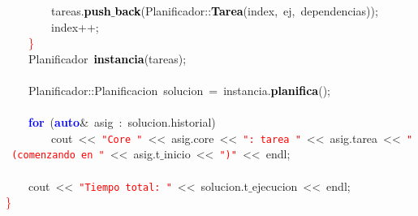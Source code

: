 \mbox{}\ \ \ \ \ \ \ \ tareas\textcolor{BrickRed}{.}\textbf{\textcolor{Black}{push$\_$back}}\textcolor{BrickRed}{(}Planificador\textcolor{BrickRed}{::}\textbf{\textcolor{Black}{Tarea}}\textcolor{BrickRed}{(}index\textcolor{BrickRed}{,}\ ej\textcolor{BrickRed}{,}\ dependencias\textcolor{BrickRed}{));} \\
\mbox{}\ \ \ \ \ \ \ \ index\textcolor{BrickRed}{++;} \\
\mbox{}\ \ \ \ \textcolor{Red}{\}} \\
\mbox{}\ \ \ \ \textcolor{TealBlue}{Planificador}\ \textbf{\textcolor{Black}{instancia}}\textcolor{BrickRed}{(}tareas\textcolor{BrickRed}{);} \\
\mbox{} \\
\mbox{}\ \ \ \ Planificador\textcolor{BrickRed}{::}\textcolor{TealBlue}{Planificacion}\ solucion\ \textcolor{BrickRed}{=}\ instancia\textcolor{BrickRed}{.}\textbf{\textcolor{Black}{planifica}}\textcolor{BrickRed}{();} \\
\mbox{} \\
\mbox{}\ \ \ \ \textbf{\textcolor{Blue}{for}}\ \textcolor{BrickRed}{(}\textbf{\textcolor{Blue}{auto}}\textcolor{BrickRed}{\&}\ asig\ \textcolor{BrickRed}{:}\ solucion\textcolor{BrickRed}{.}historial\textcolor{BrickRed}{)} \\
\mbox{}\ \ \ \ \ \ \ \ cout\ \textcolor{BrickRed}{\textless{}\textless{}}\ \texttt{\textcolor{Red}{"{}Core\ "{}}}\ \textcolor{BrickRed}{\textless{}\textless{}}\ asig\textcolor{BrickRed}{.}core\ \textcolor{BrickRed}{\textless{}\textless{}}\ \texttt{\textcolor{Red}{"{}:\ tarea\ "{}}}\ \textcolor{BrickRed}{\textless{}\textless{}}\ asig\textcolor{BrickRed}{.}tarea\ \textcolor{BrickRed}{\textless{}\textless{}}\ \texttt{\textcolor{Red}{"{}\ (comenzando\ en\ "{}}}\ \textcolor{BrickRed}{\textless{}\textless{}}\ asig\textcolor{BrickRed}{.}t$\_$inicio\ \textcolor{BrickRed}{\textless{}\textless{}}\ \texttt{\textcolor{Red}{"{})"{}}}\ \textcolor{BrickRed}{\textless{}\textless{}}\ endl\textcolor{BrickRed}{;} \\
\mbox{} \\
\mbox{}\ \ \ \ cout\ \textcolor{BrickRed}{\textless{}\textless{}}\ \texttt{\textcolor{Red}{"{}Tiempo\ total:\ "{}}}\ \textcolor{BrickRed}{\textless{}\textless{}}\ solucion\textcolor{BrickRed}{.}t$\_$ejecucion\ \textcolor{BrickRed}{\textless{}\textless{}}\ endl\textcolor{BrickRed}{;} \\
\mbox{}\textcolor{Red}{\}} \\
\mbox{}

